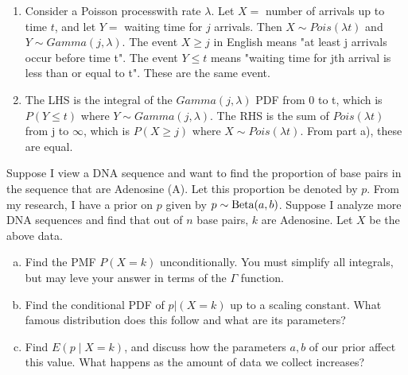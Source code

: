 \documentclass[11pt]{article}
\begin{document}
\begin{solution}
\begin{enumerate}
\item Consider a Poisson processwith rate $\lambda$. Let $X = $ number of arrivals up to time $t$, and let $Y = $ waiting time for $j$ arrivals. Then $X \sim Pois(\lambda t)$ and $Y \sim Gamma(j,\lambda)$. The event $X \ge j$ in English means "at least j arrivals occur before time t". The event $Y \le t$ means "waiting time for jth arrival is less than or equal to t". These are the same event.

\item The LHS is the integral of the $Gamma(j,\lambda)$ PDF from 0 to t, which is $P(Y \le t)$ where $Y \sim Gamma(j,\lambda)$. The RHS is the sum of $Pois(\lambda t)$ from j to $\infty$, which is $P(X \ge j)$ where $X \sim Pois(\lambda t)$. From part a), these are equal.
\end{enumerate}
\end{solution}

\begin{exercise}
Suppose I view a DNA sequence and want to find the proportion of base pairs in the sequence that are Adenosine (A). Let this proportion be denoted by $p$. From my research, I have a prior on $p$ given by $p \sim \textrm{Beta}(a,b)$. Suppose I analyze more DNA sequences and find that out of $n$ base pairs, $k$ are Adenosine. Let $X$ be the above data.
\begin{enumerate}[a)]
  \item Find the PMF $P(X=k)$ unconditionally. You must simplify all integrals, but may leve your answer in terms of the $\Gamma$ function.
  \item Find the conditional PDF of $p|(X=k)$ up to a scaling constant. What famous distribution does this follow and what are its parameters?
  \item Find $E(p \mid X = k)$, and discuss how the parameters $a,b$ of our prior affect this value. What happens as the amount of data we collect increases?
\end{enumerate}
\end{exercise}
\end{document}

